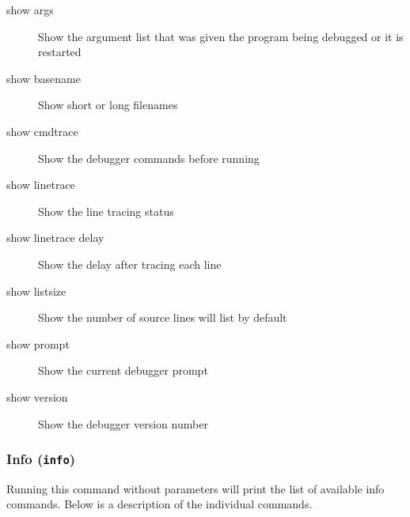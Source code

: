 \begin{description}

\item[show args]

Show the argument list that was given the program being debugged or it is
restarted

\item[show basename]

Show short or long filenames

\item[show cmdtrace]

Show the debugger commands before running

\item[show linetrace]

Show the line tracing status

\item[show linetrace delay]

Show the delay after tracing each line

\item[show listsize]

Show the number of source lines  will list by default

\item[show prompt]

Show the current debugger prompt

\item[show version]

Show the debugger version number

\end{description}

\subsubsection{Info ({\tt info})\label{subsubsection-info}}

Running this command without parameters will print the list of
available info commands. Below is a description of the individual
commands.

